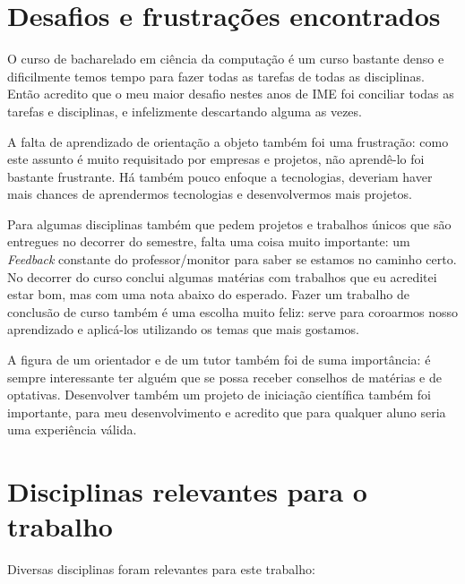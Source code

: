
\section{Desafios e frustrações encontrados}

O curso de bacharelado em ciência da computação é um curso bastante denso e dificilmente temos tempo
para fazer todas as tarefas de todas as disciplinas. Então acredito que o meu maior desafio nestes anos de IME 
foi conciliar todas as tarefas e disciplinas, e infelizmente descartando alguma as vezes. 

A falta de aprendizado de orientação a objeto também foi uma frustração: como este assunto é muito requisitado por empresas
e projetos, não aprendê-lo foi bastante frustrante. Há também pouco enfoque a tecnologias, deveriam haver mais chances de
aprendermos tecnologias e desenvolvermos mais projetos. 

Para algumas disciplinas também que pedem projetos e trabalhos únicos que são entregues no decorrer do semestre, 
falta uma coisa muito importante: um \emph{Feedback} constante do professor/monitor para saber se estamos no caminho certo. 
No decorrer do curso conclui algumas matérias com trabalhos que eu acreditei estar bom, mas com uma nota abaixo do esperado. 
Fazer um trabalho de conclusão de curso também é uma escolha muito feliz: serve para coroarmos nosso aprendizado
e aplicá-los utilizando os temas que mais gostamos.  

A figura de um orientador e de um tutor também foi de suma importância: é sempre interessante ter alguém que se possa receber
conselhos de matérias e de optativas. Desenvolver também um projeto de iniciação científica também foi importante, para 
meu desenvolvimento e acredito que para qualquer aluno seria uma experiência válida. 

 

\section{Disciplinas relevantes para o trabalho}

Diversas disciplinas foram relevantes para este trabalho:

